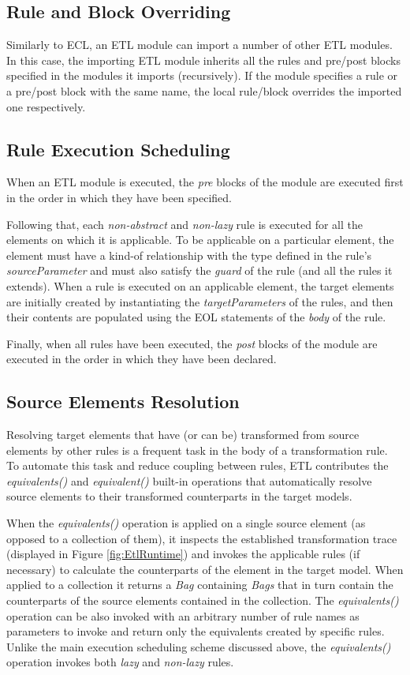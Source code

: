 \subsection{Rule and Block Overriding}
Similarly to ECL, an ETL module can import a number of other ETL modules. In this case, the importing ETL module inherits all the rules and pre/post blocks specified in the modules it imports (recursively). If the module specifies a rule or a pre/post block with the same name, the local rule/block overrides the imported one respectively.

\subsection{Rule Execution Scheduling}

When an ETL module is executed, the \emph{pre} blocks of the module are executed first in the order in which they have been specified. 

Following that, each \emph{non-abstract} and \emph{non-lazy} rule is executed for all the elements on which it is applicable. To be applicable on a particular element, the element must have a kind-of relationship with the type defined in the rule's \emph{sourceParameter} and must also satisfy the \emph{guard} of the rule (and all the rules it extends). When a rule is executed on an applicable element, the target elements are initially created by instantiating the \emph{targetParameters} of the rules, and then their contents are populated using the EOL statements of the \emph{body} of the rule.

Finally, when all rules have been executed, the \emph{post} blocks of the module are executed in the order in which they have been declared.

\subsection{Source Elements Resolution}

Resolving target elements that have (or can be) transformed from source elements by other rules is a frequent task in the body of a transformation rule. To automate this task and reduce coupling between rules, ETL contributes the \emph{equivalents()} and \emph{equivalent()} built-in operations that automatically resolve source elements to their transformed counterparts in the target models. 

When the \emph{equivalents()} operation is applied on a single source element (as opposed to a collection of them), it inspects the established transformation trace (displayed in Figure \ref{fig:EtlRuntime}) and invokes the applicable rules (if necessary) to calculate the counterparts of the element in the target model. When applied to a collection it returns a \emph{Bag} containing \emph{Bags} that in turn contain the counterparts of the source elements contained in the collection. The \emph{equivalents()} operation can be also invoked with an arbitrary number of rule names as parameters to invoke and return only the equivalents created by specific rules. Unlike the main execution scheduling scheme discussed above, the \emph{equivalents()} operation invokes both \emph{lazy} and \emph{non-lazy} rules.

